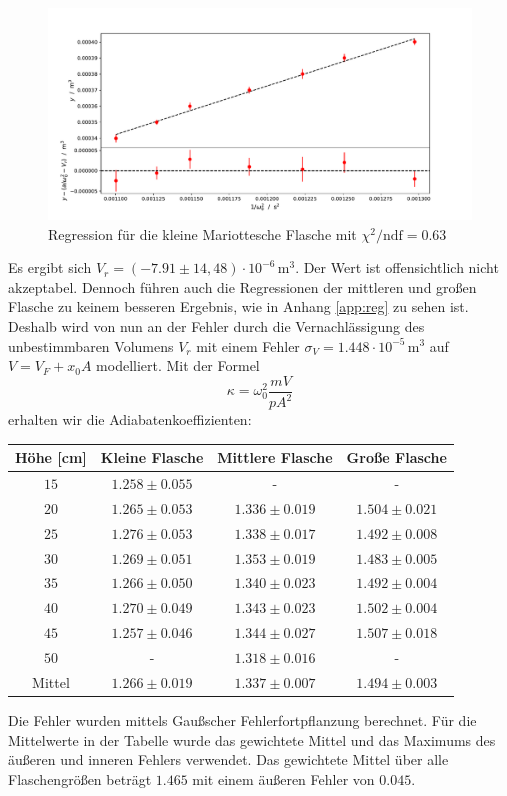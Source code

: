 \documentclass[a4paper, 12pt]{scrartcl}
\begin{document}
\begin{figure}[H]
\centering
\includegraphics[width=\textwidth]{plots/regression_kleine.pdf}
\caption{Regression für die kleine Mariottesche Flasche mit $\chi^2/\text{ndf} = 0.63$}
\label{plt:reg_kle}
\end{figure}
Es ergibt sich $V_r = (-7.91 \pm 14,48) \cdot 10^{-6}\,\text{m}^3$. Der Wert ist offensichtlich nicht akzeptabel. Dennoch führen auch die Regressionen der mittleren und großen Flasche zu keinem besseren Ergebnis, wie in Anhang \ref{app:reg} zu sehen ist. Deshalb wird von nun an der Fehler durch die Vernachlässigung des unbestimmbaren Volumens $V_r$ mit einem Fehler $\sigma_V = 1.448 \cdot 10^{-5}\,\text{m}^3$ auf $V = V_{F} + x_0A$ modelliert.
Mit der Formel
\begin{equation}
\kappa = \omega_0^2 \frac{mV}{pA^2}
\end{equation}
erhalten wir die Adiabatenkoeffizienten:

\begin{table}[H]
\centering
\begin{tabular}{c|ccc}
Höhe [cm] & Kleine Flasche & Mittlere Flasche & Große Flasche \\
\hline
$15$ & $1.258\pm 0.055$ & - & - \\
$20$ & $1.265\pm 0.053$ & $1.336\pm 0.019$ & $1.504\pm 0.021$ \\
$25$ & $1.276\pm 0.053$ & $1.338\pm 0.017$ & $1.492\pm 0.008$ \\
$30$ & $1.269\pm 0.051$ & $1.353\pm 0.019$ & $1.483\pm 0.005$ \\
$35$ & $1.266\pm 0.050$ & $1.340\pm 0.023$ & $1.492\pm 0.004$ \\
$40$ & $1.270\pm 0.049$ & $1.343\pm 0.023$ & $1.502\pm 0.004$ \\
$45$ & $1.257\pm 0.046$ & $1.344\pm 0.027$ & $1.507\pm 0.018$ \\
$50$ & - & $1.318\pm 0.016$ & - \\
\hline
Mittel & $1.266\pm 0.019$ & $1.337\pm 0.007$ & $1.494\pm 0.003$
\end{tabular}
\end{table}	
Die Fehler wurden mittels Gaußscher Fehlerfortpflanzung berechnet. Für die Mittelwerte in der Tabelle wurde das gewichtete Mittel und das Maximums des äußeren und inneren Fehlers verwendet.
Das gewichtete Mittel über alle Flaschengrößen beträgt $1.465$ mit einem äußeren Fehler von $0.045$.
\end{document}
